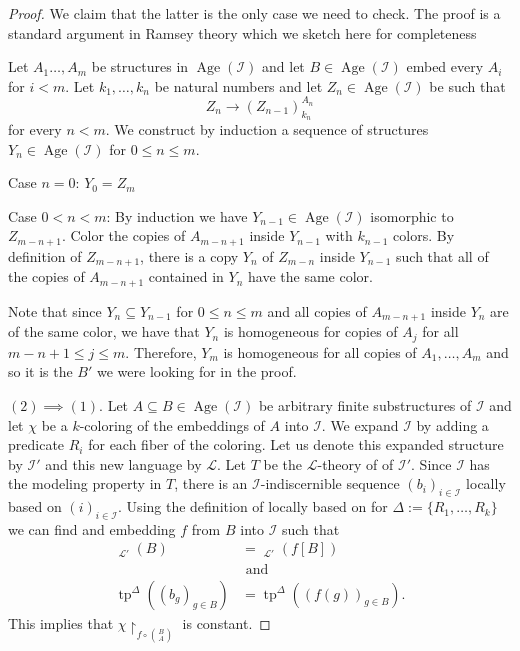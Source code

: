 \documentclass{amsart}
\newtheorem{external claim}[teor]{Claim}
\newcommand{\mL}{\mathcal{L}}
\newcommand{\I}{\mathcal{I}}
\DeclareMathOperator{\tp}{{tp}}
\DeclareMathOperator{\qftp}{{tp^{qf}}}
\DeclareMathOperator{\age}{{Age}}
\begin{document}
\begin{proof}
    We claim that the latter is the only case we need to check. The proof is a standard argument in Ramsey theory which we sketch here for completeness
    
    Let $A_1\dots,A_m$ be structures in $\age(\I)$ and let $B\in \age(\I)$ embed every $A_i$ for $i<m$. Let $k_1,\dots,k_n$ be natural numbers and let $Z_n\in \age(\I)$ be such that $$Z_n\to (Z_{n-1})^{A_n}_{k_n}$$  for every $n<m$. We construct by induction a sequence of structures $Y_n\in \age(\I)$ for $0\leq n\leq m$.

    Case $n=0$: $Y_0=Z_m$

    Case $0<n<m$: By induction we have $Y_{n-1}\in \age(\I)$ isomorphic to $Z_{m-n+1}$. Color the copies of $A_{m-n+1}$ inside $Y_{n-1}$ with $k_{n-1}$ colors. By definition of $Z_{m-n+1}$, there is a copy $Y_n$ of $Z_{m-n}$ inside $Y_{n-1}$ such that all of the copies of $A_{m-n+1}$ contained in $Y_n$ have the same color.

Note that since $Y_n\subseteq Y_{n-1}$ for $0\leq n \leq m$ and all copies of $A_{m-n+1}$ inside $Y_n$ are of the same color, we have that $Y_n$ is homogeneous for copies of $A_j$ for all $m-n+1\leq j \leq m$. Therefore, $Y_m$ is homogeneous for all copies of $A_1,\dots,A_m$ and so it is the $B'$ we were looking for in the proof.
    

    $(2)\implies(1)$. %
    Let $A\subseteq B \in \age(\I)$ be arbitrary finite substructures of $\I$ and let  $\chi$ be a $k$-coloring of the embeddings of $A$ into $\I$. We expand $\I$ by adding a predicate $R_i$ for each fiber of the coloring. Let us denote this expanded structure by $\I'$ and this new language by $\mL$. Let $T$ be the $\mL$-theory of of $\I'$. Since $\I$ has the modeling property in $T$, there is an $\I$-indiscernible sequence $(b_i)_{i\in \I}$ locally based on $(i)_{i\in \I}$. Using the definition of locally based on for $\Delta:=\{ R_1,\dots,R_k \}$ we can find and embedding $f$ from $B$ into $\I$ such that \begin{align*}
    \qftp_{\mL'}(B)&=\qftp_{\mL'}(f[B])\\ &\text{ and}\\
    \tp^{\Delta}((b_g)_{g\in B})&=\tp^{\Delta}( (f(g))_{g\in B}).
    \end{align*}
    This implies that $\chi\upharpoonright_{f\circ \binom{B}{A}}$ is constant.
\end{proof}
\end{document}
